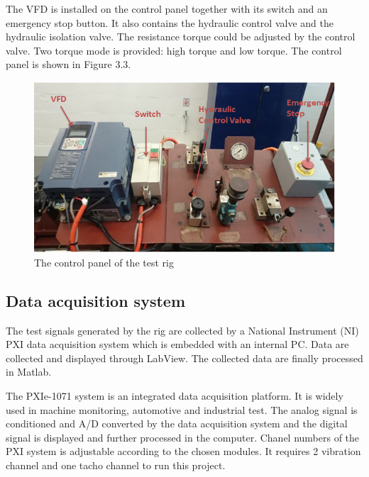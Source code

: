 The VFD is installed on the control panel together with its switch and an emergency stop button.  It also contains the hydraulic control valve and the hydraulic isolation valve. The resistance torque could be adjusted by the control valve. Two torque mode is provided: high torque and low torque. The control panel is shown in Figure 3.3.

\begin{figure}[h]
	\centering
	\includegraphics[scale = 0.7]{control}
	\caption{The control panel of the test rig}
	\label{control panel}
\end{figure}

\subsection{Data acquisition system}

The test signals generated by the rig are collected by a National Instrument (NI) PXI data acquisition system which is embedded with an internal PC. Data are collected and displayed through LabView. The collected data are finally processed in Matlab.

The PXIe-1071 system is an integrated data acquisition platform. It is widely used in machine monitoring, automotive and industrial test. The analog signal is conditioned and A/D converted by the data acquisition system and the digital signal is displayed and further processed in the computer. Chanel numbers of the PXI system is adjustable according to the chosen modules. It requires 2 vibration channel and one tacho channel to run this project.

